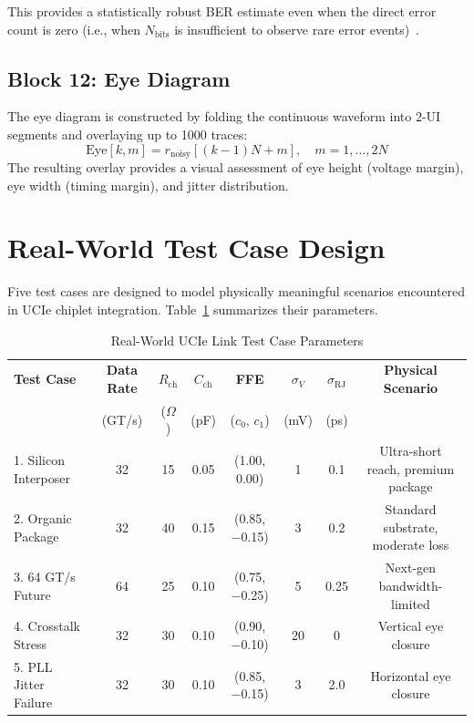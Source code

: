 \documentclass[conference]{IEEEtran}
\begin{document}
This provides a statistically robust BER estimate even when the direct error count is zero (i.e., when $N_{\text{bits}}$ is insufficient to observe rare error events)~\cite{bergano1993}.

\subsection{Block 12: Eye Diagram}

The eye diagram is constructed by folding the continuous waveform into 2-UI segments and overlaying up to 1000 traces:
\begin{equation}
    \text{Eye}[k, m] = r_{\text{noisy}}\!\left[(k-1)N + m\right], \quad m = 1, \ldots, 2N
\end{equation}
The resulting overlay provides a visual assessment of eye height (voltage margin), eye width (timing margin), and jitter distribution.

\section{Real-World Test Case Design}

Five test cases are designed to model physically meaningful scenarios encountered in UCIe chiplet integration. Table~\ref{tab:testcases} summarizes their parameters.

\begin{table}[t]
\caption{Real-World UCIe Link Test Case Parameters}
\label{tab:testcases}
\centering
\begin{tabular}{|l|c|c|c|c|c|c|c|}
\hline
\textbf{Test Case} & \textbf{Data Rate} & $R_{\text{ch}}$ & $C_{\text{ch}}$ & \textbf{FFE} & $\sigma_V$ & $\sigma_{\text{RJ}}$ & \textbf{Physical Scenario} \\
 & (GT/s) & ($\Omega$) & (pF) & ($c_0$, $c_1$) & (mV) & (ps) & \\
\hline
1. Silicon Interposer & 32 & 15 & 0.05 & (1.00, 0.00) & 1 & 0.1 & Ultra-short reach, premium package \\
2. Organic Package & 32 & 40 & 0.15 & (0.85, $-$0.15) & 3 & 0.2 & Standard substrate, moderate loss \\
3. 64 GT/s Future & 64 & 25 & 0.10 & (0.75, $-$0.25) & 5 & 0.25 & Next-gen bandwidth-limited \\
4. Crosstalk Stress & 32 & 30 & 0.10 & (0.90, $-$0.10) & 20 & 0 & Vertical eye closure \\
5. PLL Jitter Failure & 32 & 30 & 0.10 & (0.85, $-$0.15) & 3 & 2.0 & Horizontal eye closure \\
\hline
\end{tabular}
\end{table}
\end{document}
